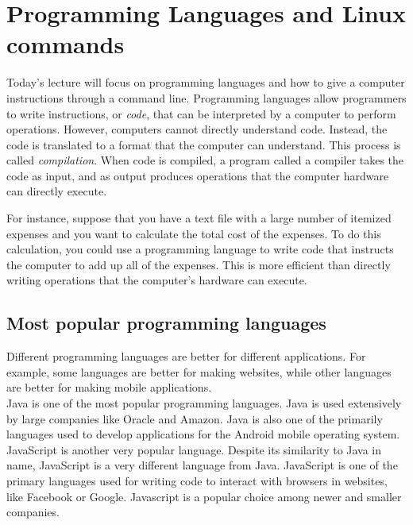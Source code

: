 \chapter{Programming Languages and Linux commands}

Today's lecture will focus on programming languages and how to give a computer instructions through a command line. Programming languages allow programmers to write instructions, or \emph{code}, that can be interpreted by a computer to perform operations. However, computers cannot directly understand code. Instead, the code is translated to a format that the computer can understand. This process is called \emph{compilation}. When code is compiled, a program called a compiler takes the code as input, and as output produces operations that the computer hardware can directly execute.


For instance, suppose that you have a text file with a large number of itemized expenses and you want to calculate the total cost of the expenses. To do this calculation, you could use a programming language to write code that instructs the computer to add up all of the expenses. This is more efficient than directly writing operations that the computer’s hardware can execute. \\ 

\section{Most popular programming languages}

Different programming languages are better for different applications. For example, some languages are better for making websites, while other languages are better for making mobile applications. \\

Java is one of the most popular programming languages. Java is used extensively by large companies like Oracle and Amazon. Java is also one of the primarily languages used to develop applications for the Android mobile operating system. \\

JavaScript is another very popular language. Despite its similarity to Java in name, JavaScript is a very different language from Java. JavaScript is one of the primary languages used for writing code to interact with browsers in websites, like Facebook or Google. 
Javascript is a popular choice among newer and smaller companies. \\

